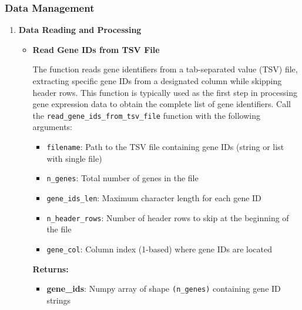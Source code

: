 \subsubsection{Data Management}
\begin{enumerate}
    \item \textbf{Data Reading and Processing}
          \begin{itemize}
            \item \textbf{Read Gene IDs from TSV File}
                  
                  The function reads gene identifiers from a tab-separated value (TSV) file,
                  extracting specific gene IDs from a designated column while skipping
                  header rows. This function is typically used as the first step in processing
                  gene expression data to obtain the complete list of gene identifiers.
                  Call the \texttt{read\_gene\_ids\_from\_tsv\_file} function with the following
                  arguments:
                  
                  \begin{itemize}
                    \item \texttt{filename}: Path to the TSV file containing gene IDs (string
                          or list with single file)
                          
                    \item \texttt{n\_genes}: Total number of genes in the file
                          
                    \item \texttt{gene\_ids\_len}: Maximum character length for each gene
                          ID
                          
                    \item \texttt{n\_header\_rows}: Number of header rows to skip at the
                          beginning of the file
                          
                    \item \texttt{gene\_col}: Column index (1-based) where gene IDs are located
                  \end{itemize}
                  
                  \textbf{Returns:}
                  \begin{itemize}
                    \item \textbf{gene\_ids}: Numpy array of shape \texttt{(n\_genes)}
                          containing gene ID strings
                  \end{itemize}
                  

\end{itemize}
\end{enumerate}
